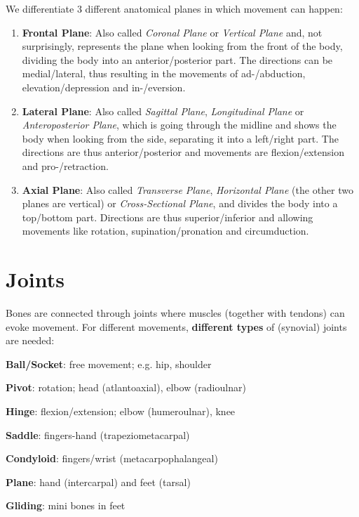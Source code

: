 We differentiate 3 different anatomical planes in which movement can happen:

\begin{enumerate}
    \item \textbf{Frontal Plane}: Also called \textit{Coronal Plane} or \textit{Vertical Plane} and, not surprisingly, represents the plane when looking from the front of the body, dividing the body into an anterior/posterior part.
    The directions can be medial/lateral, thus resulting in the movements of ad-/abduction, elevation/depression and in-/eversion.
    \item \textbf{Lateral Plane}: Also called \textit{Sagittal Plane}, \textit{Longitudinal Plane} or \textit{Anteroposterior Plane}, which is going through the midline and shows the body when looking from the side, separating it into a left/right part.
    The directions are thus anterior/posterior and movements are flexion/extension and pro-/retraction.
    \item \textbf{Axial Plane}: Also called \textit{Transverse Plane}, \textit{Horizontal Plane} (the other two planes are vertical) or \textit{Cross-Sectional Plane}, and divides the body into a top/bottom part.
    Directions are thus superior/inferior and allowing movements like rotation, supination/pronation and circumduction.
\end{enumerate}

\section{Joints}\label{sec:joints}

Bones are connected through joints where muscles (together with tendons) can evoke movement.
For different movements, \textbf{different types} of (synovial) joints are needed:

\begin{itemize*}
    \item \textbf{Ball/Socket}: free movement; e.g. hip, shoulder
    \item \textbf{Pivot}: rotation; head (atlantoaxial), elbow (radioulnar)
    \item \textbf{Hinge}: flexion/extension; elbow (humeroulnar), knee
    \item \textbf{Saddle}: fingers-hand (trapeziometacarpal)
    \item \textbf{Condyloid}: fingers/wrist (metacarpophalangeal)
    \item \textbf{Plane}: hand (intercarpal) and feet (tarsal)
    \item \textbf{Gliding}: mini bones in feet
\end{itemize*}
